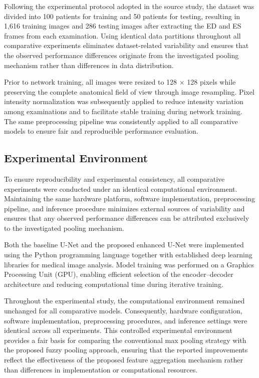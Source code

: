 Following the experimental protocol adopted in the source study, the dataset was divided into 100 patients for training and 50 patients for testing, resulting in 1,616 training images and 286 testing images after extracting the ED and ES frames from each examination. Using identical data partitions throughout all comparative experiments eliminates dataset-related variability and ensures that the observed performance differences originate from the investigated pooling mechanism rather than differences in data distribution.

Prior to network training, all images were resized to 128 $\times$ 128 pixels while preserving the complete anatomical field of view through image resampling. Pixel intensity normalization was subsequently applied to reduce intensity variation among examinations and to facilitate stable training during network training. The same preprocessing pipeline was consistently applied to all comparative models to ensure fair and reproducible performance evaluation.

\subsection{Experimental Environment}
\label{subsec:ch4-environment}

To ensure reproducibility and experimental consistency, all comparative experiments were conducted under an identical computational environment. Maintaining the same hardware platform, software implementation, preprocessing pipeline, and inference procedure minimizes external sources of variability and ensures that any observed performance differences can be attributed exclusively to the investigated pooling mechanism.

Both the baseline U-Net and the proposed enhanced U-Net were implemented using the Python programming language together with established deep learning libraries for medical image analysis. Model training was performed on a Graphics Processing Unit (GPU), enabling efficient selection of the encoder--decoder architecture and reducing computational time during iterative training.

Throughout the experimental study, the computational environment remained unchanged for all comparative models. Consequently, hardware configuration, software implementation, preprocessing procedures, and inference settings were identical across all experiments. This controlled experimental environment provides a fair basis for comparing the conventional max pooling strategy with the proposed fuzzy pooling approach, ensuring that the reported improvements reflect the effectiveness of the proposed feature aggregation mechanism rather than differences in implementation or computational resources.

